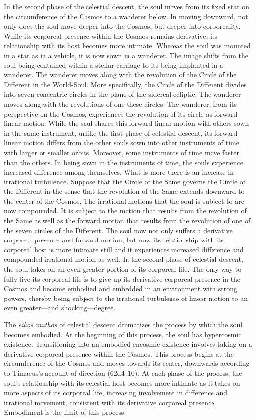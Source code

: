 In the second phase of the celestial descent, the soul moves from its fixed star on the circumference of the Cosmos to a wanderer below. In moving downward, not only does the soul move deeper into the Cosmos, but deeper into corporeality. While its corporeal presence within the Cosmos remains derivative, its relationship with its host becomes more intimate. Whereas the soul was mounted in a star as in a vehicle, it is now sown in a wanderer. The image shifts from the soul being contained within a stellar carriage to its being implanted in a wanderer. The wanderer moves along with the revolution of the Circle of the Different in the World-Soul. More specifically, the Circle of the Different divides into seven concentric circles in the plane of the sidereal ecliptic. The wanderer moves along with the revolutions of one these circles. The wanderer, from its perspective on the Cosmos, experiences the revolution of its circle as forward linear motion. While the soul shares this forward linear motion with others sown in the same instrument, unlike the first phase of celestial descent, its forward linear motion differs from the other souls sown into other instruments of time with larger or smaller orbits. Moreover, some instruments of time move faster than the others. In being sown in the instruments of time, the souls experience increased difference among themselves. What is more there is an increase in irrational turbulence. Suppose that the Circle of the Same governs the Circle of the Different in the sense that the revolution of the Same extends downward to the center of the Cosmos. The irrational motions that the soul is subject to are now compounded. It is subject to the motion that results from the revolution of the Same as well as the forward motion that results from the revolution of one of the seven circles of the Different. The soul now not only suffers a derivative corporeal presence and forward motion, but now its relationship with its corporeal host is more intimate still and it experiences increased difference and compounded irrational motion as well. In the second phase of celestial descent, the soul takes on an even greater portion of its corporeal life. The only way to fully live its corporeal life is to give up its derivative corporeal presence in the Cosmos and become embodied and embedded in an environment with strong powers, thereby being subject to the irrational turbulence of linear motion to an even greater---and shocking---degree. 

The \emph{eikos muthos} of celestial descent dramatizes the process by which the soul becomes embodied. At the beginning of this process, the soul has hypercosmic existence. Transitioning into an embodied encosmic existence involves taking on a derivative corporeal presence within the Cosmos. This process begins at the circumference of the Cosmos and moves towards its center, downwards according to Timaeus's account of direction (62d4–10). At each phase of the process, the soul's relationship with its celestial host becomes more intimate as it takes on more aspects of its corporeal life, increasing involvement in difference and irrational movement, consistent with its derivative corporeal presence. Embodiment is the limit of this process. 

